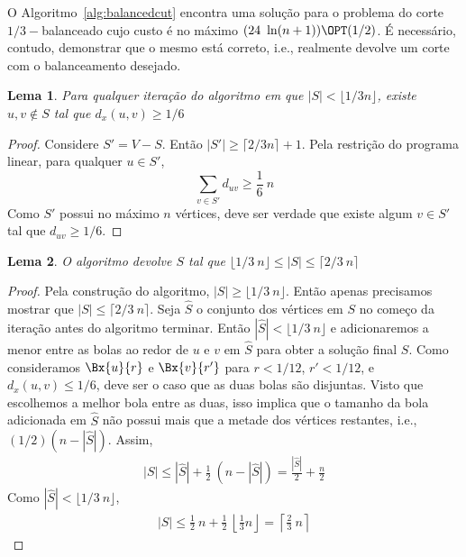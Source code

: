 \documentclass[12pt, a4paper]{article}
\newtheorem{lema}{Lema}[section]
\begin{document}
O Algoritmo~\ref{alg:balancedcut} encontra uma solução para o problema do corte $1/3-$balanceado cujo custo é no máximo $(24\ \ln(n+1)) \OPT(1/2)$. É necessário, contudo, demonstrar que o mesmo está correto, i.e., realmente devolve um corte com o balanceamento desejado.

\begin{lema}
Para qualquer iteração do algoritmo em que $|S| < \lfloor 1/3 n \rfloor$, existe $u, v \notin S$ tal que $d_x(u, v) \geq 1/6$
\end{lema}
\begin{proof}
Considere $S' = V - S$. Então $|S'| \geq \lceil 2/3 n \rceil+1$.
Pela restrição do programa linear, para qualquer $u \in S'$,
\[
\sum_{v \in S'} d_{u v} \geq \frac{1}{6}\ n
\]
Como $S'$ possui no máximo $n$ vértices, deve ser verdade que existe algum $v \in S'$ tal que $d_{u v} \geq 1/6$.
\end{proof}

\begin{lema}
O algoritmo devolve $S$ tal que $\lfloor 1/3\ n \rfloor \leq |S| \leq \lceil 2/3\ n \rceil$
\end{lema}
\begin{proof}
Pela construção do algoritmo, $|S| \geq \lfloor 1/3\ n \rfloor$. Então apenas precisamos mostrar que $|S| \leq \lceil 2/3\ n \rceil$.
Seja $\hat{S}$ o conjunto dos vértices em $S$ no começo da iteração antes do algoritmo terminar.
Então $|\hat{S}| < \lfloor 1/3\ n \rfloor$ e adicionaremos a menor entre as bolas ao redor de $u$ e $v$ em $\hat{S}$ para obter a solução final $S$.
Como consideramos $\Bx{u}{r}$ e $\Bx{v}{r'}$ para $r < 1/12$, $r' < 1/12$, e $d_x(u, v) \leq 1/6$, deve ser o caso que as duas bolas são disjuntas.
Visto que escolhemos a melhor bola entre as duas, isso implica que o tamanho da bola adicionada em $\hat{S}$ não possui mais que a metade dos vértices restantes, i.e., $(1/2)(n-|\hat{S}|)$.
Assim,
\begin{gather*}
    |S| \leq |\hat{S}| + \frac{1}{2}\ (n-|\hat{S}|) = \frac{|\hat{S}|}{2} + \frac{n}{2}
\end{gather*}
Como $|\hat{S}| < \lfloor 1/3\ n \rfloor$,
\begin{gather*}
    |S| \leq \frac{1}{2}\ n + \frac{1}{2}\ \left\lfloor\frac{1}{3} n \right\rfloor = \left\lceil \frac{2}{3}\ n \right\rceil
\end{gather*}
\end{proof}
\end{document}
